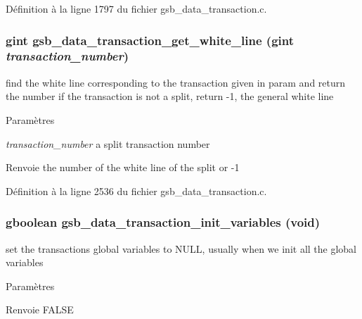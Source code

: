 Définition à la ligne 1797 du fichier gsb\_\-data\_\-transaction.c.

\subsubsection[{gsb\_\-data\_\-transaction\_\-get\_\-white\_\-line}]{\setlength{\rightskip}{0pt plus 5cm}gint gsb\_\-data\_\-transaction\_\-get\_\-white\_\-line (gint {\em transaction\_\-number})}\label{gsb__data__transaction_8h_aaa9fc2828adf9b46a72b51e31df44d58}
find the white line corresponding to the transaction given in param and return the number if the transaction is not a split, return -\/1, the general white line


\begin{DoxyParams}{Paramètres}
\item[{\em transaction\_\-number}]a split transaction number\end{DoxyParams}
\begin{DoxyReturn}{Renvoie}
the number of the white line of the split or -\/1 
\end{DoxyReturn}


Définition à la ligne 2536 du fichier gsb\_\-data\_\-transaction.c.

\subsubsection[{gsb\_\-data\_\-transaction\_\-init\_\-variables}]{\setlength{\rightskip}{0pt plus 5cm}gboolean gsb\_\-data\_\-transaction\_\-init\_\-variables (void)}\label{gsb__data__transaction_8h_a63f15bb161bcca8969c77167a8ae0b97}
set the transactions global variables to NULL, usually when we init all the global variables


\begin{DoxyParams}{Paramètres}
\item[{\em }]\end{DoxyParams}
\begin{DoxyReturn}{Renvoie}
FALSE 
\end{DoxyReturn}


